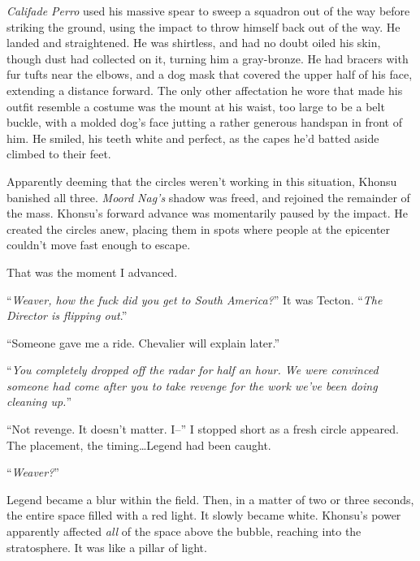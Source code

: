 \emph{Califa}\emph{de Perro }used his massive spear to sweep a squadron out of the way before striking the ground, using the impact to throw himself back out of the way.  He landed and straightened.  He was shirtless, and had no doubt oiled his skin, though dust had collected on it, turning him a gray-bronze.  He had bracers with fur tufts near the elbows, and a dog mask that covered the upper half of his face, extending a distance forward.  The only other affectation he wore that made his outfit resemble a costume was the mount at his waist, too large to be a belt buckle, with a molded dog's face jutting a rather generous handspan in front of him.  He smiled, his teeth white and perfect, as the capes he'd batted aside climbed to their feet.



Apparently deeming that the circles weren't working in this situation, Khonsu banished all three.  \emph{Moord Nag's} shadow was freed, and rejoined the remainder of the mass.  Khonsu's forward advance was momentarily paused by the impact.  He created the circles anew, placing them in spots where people at the epicenter couldn't move fast enough to escape.



That was the moment I advanced.



``\emph{Weaver, how the fuck did you get to South America?}''  It was Tecton.  ``\emph{The Director is flipping out}.''



``Someone gave me a ride.  Chevalier will explain later.''



``\emph{You completely dropped off the radar for half an hour.  We were convinced someone had come after you to take revenge for the work we've been doing cleaning up.}''



``Not revenge.  It doesn't matter.  I--'' I stopped short as a fresh circle appeared.  The placement, the timing\ldots Legend had been caught.



``\emph{Weaver?}''



Legend became a blur within the field.  Then, in a matter of two or three seconds, the entire space filled with a red light.  It slowly became white.  Khonsu's power apparently affected \emph{all} of the space above the bubble, reaching into the stratosphere.  It was like a pillar of light.



